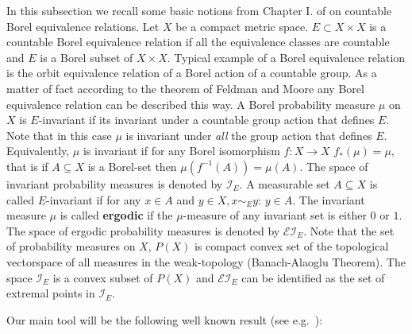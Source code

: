 \documentclass{article}
\newcommand{\I}{\mathcal{I}}
\newcommand{\EI}{\mathcal{EI}}
\begin{document}
 In this subsection we recall some basic notions from Chapter I. of \cite{KM} 
on countable
Borel equivalence relations.
 Let $X$ be a compact metric space. $E\subset X\times X$ is a 
countable Borel equivalence relation if all the equivalence classes are
countable and $E$ is a Borel subset of $X\times X$. Typical example of a Borel 
equivalence relation is the orbit equivalence relation of a Borel action of
a countable group. As a matter of fact according to the theorem of Feldman and
Moore any Borel equivalence relation can be described this way.
A Borel probability measure $\mu$ on $X$ is $E$-invariant
 if its invariant under
a countable group action that defines $E$. Note that in this case $\mu$ is 
invariant under {\it all} the group action that defines $E$. Equivalently,
$\mu$ is invariant if for any Borel isomorphism $f:X\to X$ $f_*(\mu)=\mu$,
that is if $A\subseteq X$ is a Borel-set then $\mu(f^{-1}(A))=\mu(A)$.
The space of invariant probability measures is denoted by $\I_E$.
A measurable set $A\subseteq X$ is called $E$-invariant if for 
any $x\in A$ and 
$y\in X, x \sim_E y$: $y\in A$. 
The invariant measure $\mu$ is called {\bf ergodic}
if the $\mu$-measure of any invariant set is either $0$ or $1$. 
The space of ergodic probability measures is denoted by
$\EI_E$.
Note that the set of probability measures on $X$, $P(X)$ is compact convex
set of the topological vectorspace of all measures in the weak-topology 
(Banach-Alaoglu
Theorem). 
The space $\I_E$ is a convex subset of $P(X)$ and
$\EI_E$ can be identified as the set of extremal points in $\I_E$.

\noindent
Our main tool will be the following well known result (see
e{.}g{.}~\cite{KM}):
\end{document}
